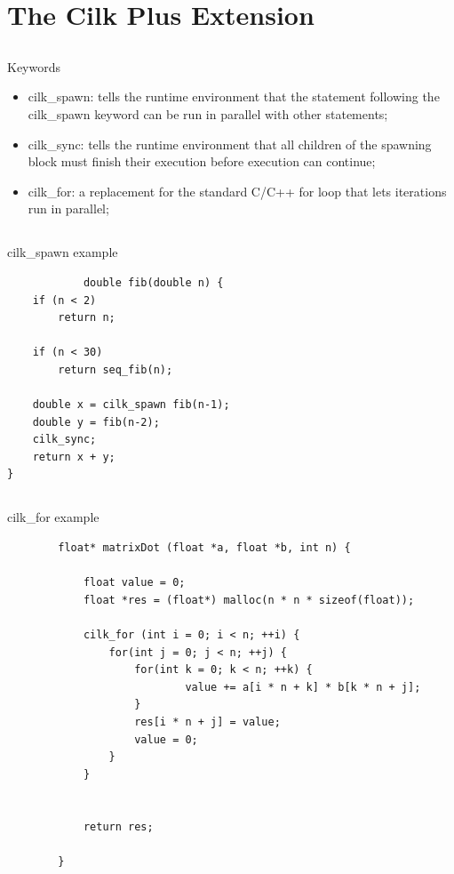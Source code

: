 \documentclass{beamer}
\begin{document}
\section{The Cilk Plus Extension}
\subsection{}
\begin{frame}[fragile]
	\begin{block}{Keywords}	
		\begin{itemize}
			\item cilk\_spawn: tells the runtime environment that the statement following the cilk\_spawn keyword can be run in parallel with other statements;
			\item cilk\_sync: tells the runtime environment that all children of the spawning block must finish their execution before execution can continue;
			\item cilk\_for: a replacement for the standard C/C++ for loop that lets iterations run in parallel;
		\end{itemize}
	\end{block}
\end{frame}


\subsection{}
\begin{frame}[fragile]
	\begin{block}{cilk\_spawn example}	
		\begin{lstlisting}
			double fib(double n) {
    if (n < 2)
        return n;

    if (n < 30)
        return seq_fib(n);

    double x = cilk_spawn fib(n-1);
    double y = fib(n-2);
    cilk_sync;
    return x + y;
}
		\end{lstlisting}
	\end{block}
\end{frame}



\subsection{}
\begin{frame}[fragile]
	\begin{block}{cilk\_for example}	
		\begin{lstlisting}
		float* matrixDot (float *a, float *b, int n) {
			
			float value = 0;
			float *res = (float*) malloc(n * n * sizeof(float));

			cilk_for (int i = 0; i < n; ++i) {
				for(int j = 0; j < n; ++j) {			
					for(int k = 0; k < n; ++k) {
							value += a[i * n + k] * b[k * n + j];
					}
					res[i * n + j] = value;
					value = 0;
				}
			}
			
			
			return res;

		}
		\end{lstlisting}
	\end{block}
\end{frame}
\end{document}
